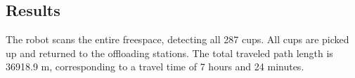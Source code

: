 \subsection{Results}
The robot scans the entire freespace, detecting all 287 cups.
All cups are picked up and returned to the offloading stations.
The total traveled path length is 36918.9 m, corresponding to a travel time of 7 hours and 24 minutes.